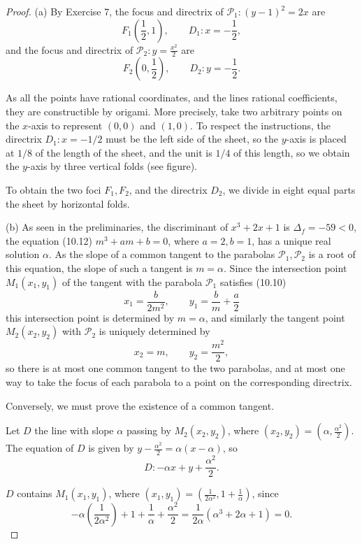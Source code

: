 \documentclass[11pt,a4paper]{article}
\begin{document}
\begin{proof}
\item[(a)] By Exercise 7, the focus and directrix of ${\mathscr P} _1 : (y-1)^2 = 2x$ are $$F_1\left (\frac{1}{2},1\right), \qquad D_1 : x = -\frac{1}{2},$$
and the focus and directrix of ${\mathscr P} _2 : y = \frac{x^2}{2}$ are $$F_2\left(0,\frac{1}{2}\right), \qquad D_2 : y = -\frac{1}{2}.$$

As all the points have rational coordinates, and the lines rational coefficients, they are constructible by origami. More precisely, take two arbitrary points on the $x$-axis to represent $(0,0)$ and $(1,0)$. To respect the instructions, the directrix $D_1 : x = -1/2$ must be the left side of the sheet, so the $y$-axis is placed at $1/8$ of the length of the sheet, and the unit is $1/4$ of this length, so we obtain the $y$-axis by three vertical folds (see figure). 

To obtain the two foci $F_1,F_2$, and the directrix $D_2$, we divide in eight equal parts the sheet by horizontal folds.

\item[(b)] As seen in the preliminaries, the discriminant of $x^3+2x+1$ is $\Delta_f =  -59<0$, the equation (10.12) $m^3+am+b = 0$, where $a = 2,b=1$, has a unique real solution $\alpha$. As the slope of a common tangent to the parabolas ${\mathscr P} _1,{\mathscr P} _2$ is a  root of this equation, the slope of such a tangent is $m=\alpha$. Since the intersection point $M_1(x_1,y_1)$ of the tangent with the parabola ${\mathscr P} _1$ satisfies (10.10)
$$x_1 = \frac{b}{2m^2}, \qquad y_1 = \frac{b}{m} + \frac{a}{2}$$
this intersection point is determined by $m = \alpha$, and similarly the tangent point  $M_2(x_2,y_2)$ with ${\mathscr P} _2$ is uniquely determined by 
$$x_2 = m, \qquad y_2 = \frac{m^2}{2},$$ so there is at most one common tangent to the two parabolas, and at most one way to take the focus of each parabola to a point on the corresponding directrix.

Conversely, we must prove the existence of a common tangent.

Let $D$ the line with slope $\alpha$ passing by $M_2(x_2,y_2)$, where $(x_2,y_2) = (\alpha,\frac{\alpha^2}{2})$. The equation of $D$ is given by $y-\frac{\alpha^2}{2} = \alpha (x-\alpha)$, so
$$D : -\alpha x + y +\frac{\alpha^2}{2}.$$

$D$ contains $M_1(x_1,y_1)$, where $(x_1,y_1) = (\frac{1}{2\alpha^2},1+\frac{1}{\alpha})$, since
$$-\alpha\left (\frac{1}{2\alpha^2}\right) + 1 + \frac{1}{\alpha} + \frac{\alpha^2}{2} = \frac{1}{2\alpha}(\alpha^3+2\alpha+1) = 0.$$


\end{proof}
\end{document}
